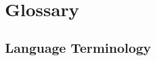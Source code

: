 \newcommand{\namelistlabel}[1]{\mbox{#1}\hfil}
\newenvironment{namelist}[1]{%
\begin{list}{}
       {\let\makelabel\namelistlabel
        \settowidth{\labelwidth}{#1}
        \setlength{\leftmargin}{1.3\labelwidth}
}
}{%
\end{list}}

\newcommand{\gitem}[1]{\item[{\parbox[b]{3.3cm}{\raggedleft \bf \Term{#1}}}]}


\section{Glossary}\label{sec:glossary}

\subsection{Language Terminology}

